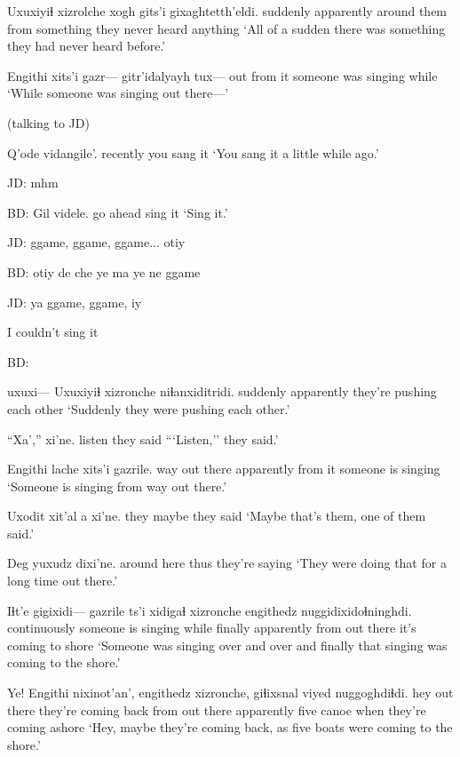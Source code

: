 \documentclass[12pt]{article}
\begin{document}
\gll Uxuxiyiɬ xizrolche xogh gits'i gixaghtetth'eldi.
suddenly apparently {around them} {from something} {they never heard anything}
\glt `All of a sudden there was something they had never heard before.'
\glend

\gll Engithi xits'i gazr--- gitr'idalyayh  tux---
out    {from it} {} {someone was singing} while
\glt `While someone was singing out there---'
\glend

(talking to JD)

\gll Q'ode vidangile'.
recently {you sang it}
\glt `You sang it a little while ago.'
\glend

JD:  mhm

BD:
\gll Gil videle.
{go ahead} {sing it}
\glt `Sing it.'
\glend

JD:  ggame, ggame, ggame... otiy
 
BD:                            otiy  de che ye ma ye ne ggame

JD:  ya ggame, ggame, iy

I couldn't sing it

BD:  

\gll uxuxi--- Uxuxiyiɬ xizronche niɬanxiditridi. 
{} suddenly apparently {they're pushing each other}
\glt `Suddenly they were pushing each other.'
\glend

\gll ``Xa','' xi'ne.
listen {they said}
\glt ```Listen,'' they said.'
\glend

\gll Engithi lache xits'i gazrile.
{way out there} apparently {from it} {someone is singing}
\glt `Someone is singing from way out there.'
\glend

\gll Uxodit {xit'al} a xi'ne.
they  maybe {} {they said}
\glt `Maybe that's them, one of them said.'
\glend

\gll Deg yuxudz dixi'ne.
{around here} {thus} {they're saying}
\glt `They were doing that for a long time out there.'
\glend

\gll Iɬt'e gigixidi--- gazrile ts'i  xidigaɬ xizronche engithedz nuggidixidoɬninghdi.
continuously {someone is singing} while {} finally apparently {from out there} {it's coming to shore}
\glt `Someone was singing over and over and finally that singing was coming to the shore.'
\glend

\gll Ye! Engithi nixinot'an', engithedz xizronche, giɬixsnal viyed nuggoghdiɬdi.
hey {out there} {they're coming back} {from out there} apparently five canoe {when they're coming ashore}
\glt `Hey, maybe they're coming back, as five boats were coming to the shore.'
\glend
\end{document}
